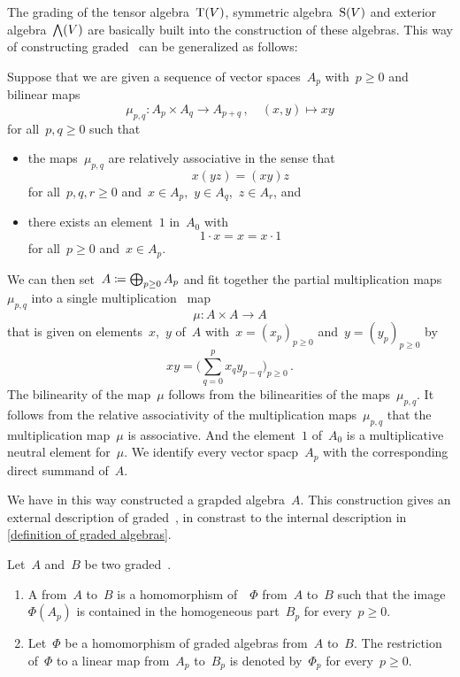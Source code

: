 \begin{remark}
	\label{external description of graded algebras}
	The grading of the tensor algebra~$\operatorname{T}(V)$, symmetric algebra~$\operatorname{S}(V)$ and exterior algebra~$\operatorname{\bigwedge}(V)$ are basically built into the construction of these algebras.
	This way of constructing graded~\algebras{$\kf$} can be generalized as follows:
	
	Suppose that we are given a sequence of vector spaces~$A_p$ with~$p \geq 0$ and bilinear maps
	\[
		\mu_{p,q}
		\colon
		A_p \times A_q
		\to
		A_{p+q} \,,
		\quad
		(x,y)
		\mapsto
		xy
	\]
	for all~$p, q \geq 0$ such that
	\begin{itemize}
		\item
			the maps~$\mu_{p, q}$ are relatively associative in the sense that
			\[
				x(yz)
				=
				(xy)z
			\]
			for all~$p, q, r \geq 0$ and~$x \in A_p$,~$y \in A_q$,~$z \in A_r$, and
		\item
			there exists an element~$1$ in~$A_0$ with
			\[
				1 \cdot x
				=
				x
				=
				x \cdot 1
			\]
			for all~$p \geq 0$ and~$x \in A_p$.
	\end{itemize}
	We can then set~$A \coloneqq \bigoplus_{p \geq 0} A_p$ and fit together the partial multiplication maps~$\mu_{p,q}$ into a single multiplication~ map
	\[
		\mu
		\colon
		A \times A
		\to
		A
	\]
	that is given on elements~$x$,~$y$ of~$A$ with~$x = (x_p)_{p \geq 0}$ and~$y = (y_p)_{p \geq 0}$ by
	\[
		x y
		=
		\Biggl( \sum_{q=0}^p x_q y_{p-q} \Biggr)_{p \geq 0}  \,.
	\]
	The bilinearity of the map~$\mu$ follows from the bilinearities of the maps~$\mu_{p,q}$.
	It follows from the relative associativity of the multiplication maps~$\mu_{p,q}$ that the multiplication map~$\mu$ is associative.
	And the element~$1$ of~$A_0$ is a multiplicative neutral element for~$\mu$.
	We identify every vector spacp~$A_p$ with the corresponding direct summand of~$A$.

	We have in this way constructed a grapded algebra~$A$.
	This construction gives an external description of graded~\algebras{$\kf$}, in constrast to the internal description in \cref{definition of graded algebras}.
\end{remark}


\begin{definition}
	Let~$A$ and~$B$ be two graded~\algebras{$\kf$}.
	\begin{enumerate}
		\item
			A  from~$A$ to~$B$ is a homomorphism of~\algebras{$\kf$}~$\Phi$ from~$A$ to~$B$ such that the image~$\Phi(A_p)$ is contained in the homogeneous part~$B_p$ for every~$p \geq 0$.
		\item
			Let~$\Phi$ be a homomorphism of graded algebras from~$A$ to~$B$.
			The restriction of~$\Phi$ to a linear map from~$A_p$ to~$B_p$ is denoted by~$\Phi_p$ for every~$p \geq 0$.
	\end{enumerate}
\end{definition}


